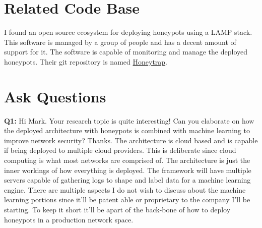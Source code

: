     \section{Related Code Base}
    \label{sec:code}
        I found an open source ecosystem for deploying honeypots using a LAMP stack.
        This software is managed by a group of people and has a decent amount of support for it.
        The software is capable of monitoring and manage the deployed honeypots.
        Their git repository is named \href{https://github.com/honeytrap/honeytrap}{Honeytrap}.

    \section{Ask Questions}

    \textbf{Q1:} Hi Mark. Your research topic is quite interesting! Can you elaborate on how the deployed architecture with honeypots is combined with machine learning to improve network security? Thanks.
    \newline
    The architecture is cloud based and is capable if being deployed to multiple cloud providers. This is deliberate since cloud computing is what most networks are comprised of. The architecture is just the inner workings of how everything is deployed. The framework will have multiple servers capable of gathering logs to shape and label data for a machine learning engine. There are multiple aspects I do not wish to discuss about the machine learning portions since it'll be patent able or proprietary to the company I'll be starting. To keep it short it'll be apart of the back-bone of how to deploy honeypots in a production network space.


    \flushend
